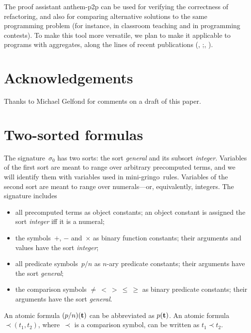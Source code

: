 \documentclass{tlp}
\def\citebb#1#2{(\citeauthor{#1}, \citeyear{#1};\citeauthor{#2}, \citeyear{#2})}
\def\gringo{{\sc gringo}}
\begin{document}
The proof assistant {\sc anthem-p2p} can be used for verifying the
correctness of refactoring, and also for comparing alternative
solutions to the same programming problem (for instance, in classroom
teaching and in programming contests).
To make this tool more versatile, we plan to make it applicable to
programs with aggregates, along the lines of recent publications
\citebb{fan22a}{lif22a}.\todo{}

\section*{Acknowledgements}

Thanks to Michael Gelfond for comments on a draft of this paper.




\appendix

\section{Two-sorted formulas} \label{appa}

The signature~$\sigma_0$ \cite[Section~2.2]{fan22}
has two sorts: the sort \emph{general} and its subsort
\emph{integer}.
Variables of the first sort are meant to
range over arbitrary precomputed terms, and we will identify them with
variables used in mini-\gringo\ rules.  Variables of the second sort are meant
to range over numerals---or, equivalently, integers.
The signature includes
\begin{itemize}
\item all precomputed terms as object constants; an object constant
  is assigned the sort \emph{integer} iff it is a numeral;
\item the symbols~$+$, $-$ and~$\times$ as binary function constants;
  their arguments and values have the sort \emph{integer};
\item all predicate symbols~$p/n$ as $n$-ary predicate
  constants; their arguments have the sort \emph{general};
\item the comparison symbols
$\neq\ <\ >\ \leq\ \geq$
as binary predicate constants; their arguments have the sort \emph{general}.
\end{itemize}
An atomic formula $(p/n)({\bf t})$ can be abbreviated
as $p({\bf t})$. An atomic formula $\prec\!\!(t_1,t_2)$, where~$\prec$ is a
comparison symbol, can be written as $t_1\prec t_2$.
\end{document}
